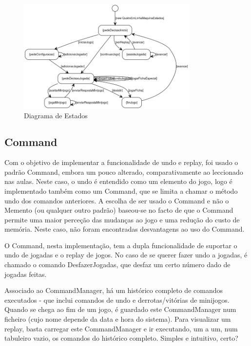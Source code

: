\documentclass[11pt]{article}
\begin{document}
	 \begin{figure}[h]
	 	\includegraphics[width=0.8\textwidth]{diagrama-estados}
	 	\centering
	 	\caption{Diagrama de Estados}
	 	\label{fig:diag-estados}
	 \end{figure}
	
	\pagebreak
	
	\large
	\subsection{Command}
	\normalsize
	
	Com o objetivo de implementar a funcionalidade de undo e replay, foi usado o padrão Command, embora um pouco alterado, comparativamente ao leccionado nas aulas. Neste caso, o undo é entendido como um elemento do jogo, logo é implementado também como um Command, que se limita a chamar o método undo dos comandos anteriores. A escolha de ser usado o Command e não o Memento (ou qualquer outro padrão) baseou-se no facto de que o Command permite uma maior perceção das mudanças ao jogo e uma redução do custo de memória. Neste caso, não foram encontradas desvantagens ao uso do Command.
	
	O Command, nesta implementação, tem a dupla funcionalidade de suportar o undo de jogadas e o replay de jogos. No caso de se querer fazer undo a jogadas, é chamado o comando DesfazerJogadas, que desfaz um certo número dado de jogadas feitas.
	
	Associado ao CommandManager, há um histórico completo de comandos executados - que inclui comandos de undo e derrotas/vitórias de minijogos. Quando se chega ao fim de um jogo, é guardado este CommandManager num ficheiro (cujo nome depende da data e hora do sistema). Para visualizar um replay, basta carregar este CommandManager e ir executando, um a um, num tabuleiro vazio, os comandos do histórico completo. Simples e intuitivo, certo?
	
\end{document}
